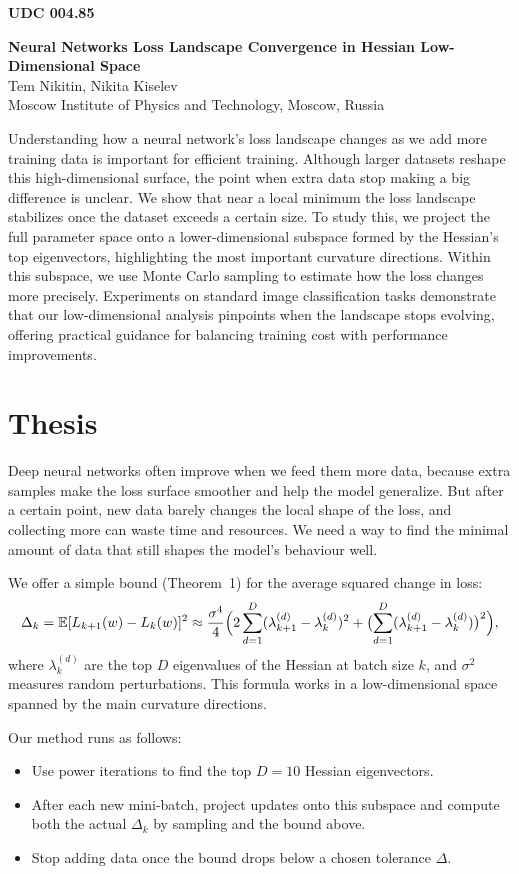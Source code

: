 \documentclass[a4paper,12pt]{article}
\begin{document}
\noindent\textbf{UDC 004.85}\\[2ex]
\begin{center}
  {\LARGE \textbf{Neural Networks Loss Landscape Convergence in Hessian Low-Dimensional Space}}\\[2ex]
  Tem Nikitin, Nikita Kiselev\\[1ex]
  Moscow Institute of Physics and Technology, Moscow, Russia
\end{center}
Understanding how a neural network’s loss landscape changes as we add more training data is important for efficient training. Although larger datasets reshape this high-dimensional surface, the point when extra data stop making a big difference is unclear. We show that near a local minimum the loss landscape stabilizes once the dataset exceeds a certain size. To study this, we project the full parameter space onto a lower-dimensional subspace formed by the Hessian’s top eigenvectors, highlighting the most important curvature directions. Within this subspace, we use Monte Carlo sampling to estimate how the loss changes more precisely. Experiments on standard image classification tasks demonstrate that our low-dimensional analysis pinpoints when the landscape stops evolving, offering practical guidance for balancing training cost with performance improvements.


\section*{Thesis}

Deep neural networks often improve when we feed them more data, because extra samples make the loss surface smoother and help the model generalize. But after a certain point, new data barely changes the local shape of the loss, and collecting more can waste time and resources. We need a way to find the minimal amount of data that still shapes the model’s behaviour well.

We offer a simple bound (Theorem~1) for the average squared change in loss:
$$
\Delta_k = \mathbb{E}[L_{k+1}(w) - L_k(w)]^2 \approx \frac{\sigma^4}{4} \Bigl(2\sum_{d=1}^D(\lambda_{k+1}^{(d)} - \lambda_k^{(d)})^2 + \bigl(\sum_{d=1}^D(\lambda_{k+1}^{(d)} - \lambda_k^{(d)})\bigr)^2\Bigr),
$$
where $\lambda_k^{(d)}$ are the top $D$ eigenvalues of the Hessian at batch size $k$, and $\sigma^2$ measures random perturbations. This formula works in a low-dimensional space spanned by the main curvature directions.

Our method runs as follows:
\begin{itemize}
  \item Use power iterations to find the top $D=10$ Hessian eigenvectors.
  \item After each new mini-batch, project updates onto this subspace and compute both the actual $\Delta_k$ by sampling and the bound above.
  \item Stop adding data once the bound drops below a chosen tolerance $\Delta$.
\end{itemize}
\end{document}
